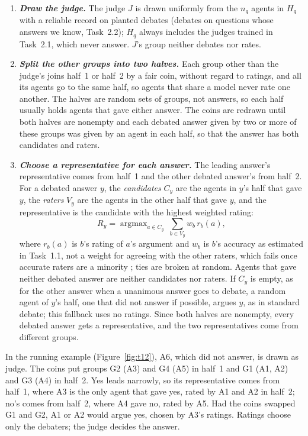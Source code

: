 \documentclass[12pt,letterpaper]{article}
\newcommand{\slab}[1]{\textbf{\textit{#1}}}
\begin{document}
\begin{enumerate}[label=(\arabic*),leftmargin=1.9em]
\item \slab{Draw the judge.} The judge $J$ is drawn uniformly from the $n_q$ agents in $H_q$ with a reliable record on planted debates (debates on questions whose answers we know, Task~2.2); $H_q$ always includes the judges trained in Task~2.1, which never answer. $J$'s group neither debates nor rates.
\item \slab{Split the other groups into two halves.} Each group other than the judge's joins half~1 or half~2 by a fair coin, without regard to ratings, and all its agents go to the same half, so agents that share a model never rate one another. The halves are random sets of groups, not answers, so each half usually holds agents that gave either answer. The coins are redrawn until both halves are nonempty and each debated answer given by two or more of these groups was given by an agent in each half, so that the answer has both candidates and raters.
\item \slab{Choose a representative for each answer.} The leading answer's representative comes from half~1 and the other debated answer's from half~2. For a debated answer $y$, the \emph{candidates} $C_y$ are the agents in $y$'s half that gave $y$, the \emph{raters} $V_y$ are the agents in the other half that gave $y$, and the representative is the candidate with the highest weighted rating:
\begin{equation}
R_y=\mathop{\arg\max}_{a\in C_y}\ \sum_{b\in V_y} w_b\,r_b(a),
\label{eq:rep}
\end{equation}
where $r_b(a)$ is $b$'s rating of $a$'s argument and $w_b$ is $b$'s accuracy as estimated in Task~1.1, not a weight for agreeing with the other raters, which fails once accurate raters are a minority \citep{lev2023peernomination}; ties are broken at random. Agents that gave neither debated answer are neither candidates nor raters. If $C_y$ is empty, as for the other answer when a unanimous answer goes to debate, a random agent of $y$'s half, one that did not answer if possible, argues $y$, as in standard debate; this fallback uses no ratings. Since both halves are nonempty, every debated answer gets a representative, and the two representatives come from different groups.
\end{enumerate}
In the running example (Figure~\ref{fig:t12}), A6, which did not answer, is drawn as judge. The coins put groups G2 (A3) and G4 (A5) in half~1 and G1 (A1, A2) and G3 (A4) in half~2. Yes leads narrowly, so its representative comes from half~1, where A3 is the only agent that gave yes, rated by A1 and A2 in half~2; no's comes from half~2, where A4 gave no, rated by A5. Had the coins swapped G1 and G2, A1 or A2 would argue yes, chosen by A3's ratings. Ratings choose only the debaters; the judge decides the answer.
\end{document}
